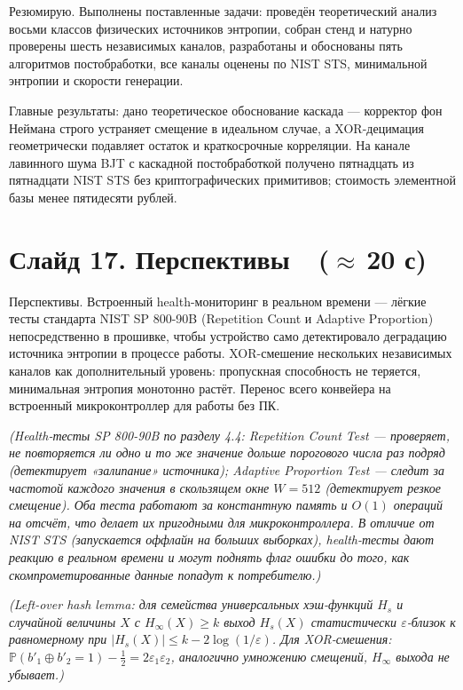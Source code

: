 \documentclass[12pt,a4paper]{extarticle}
\newcommand{\note}[1]{%
  \par
  {\small\color{noteclr}\itshape (#1)}%
  \par}
\begin{document}
Резюмирую. Выполнены поставленные задачи: проведён теоретический анализ
восьми классов физических источников энтропии, собран стенд и натурно
проверены шесть независимых каналов, разработаны и обоснованы пять
алгоритмов постобработки, все каналы оценены по NIST STS, минимальной
энтропии и скорости генерации.

Главные результаты: дано теоретическое обоснование каскада --- корректор
фон Неймана строго устраняет смещение в идеальном случае, а XOR-децимация
геометрически подавляет остаток и краткосрочные корреляции. На канале
лавинного шума BJT с каскадной постобработкой получено пятнадцать из
пятнадцати NIST STS без криптографических примитивов; стоимость элементной
базы менее пятидесяти рублей.

\section*{Слайд 17. Перспективы~~($\approx$\,20 с)}

Перспективы. Встроенный health-мониторинг в реальном времени --- лёгкие
тесты стандарта NIST SP 800-90B (Repetition Count и Adaptive Proportion)
непосредственно в прошивке, чтобы устройство само детектировало деградацию
источника энтропии в процессе работы. XOR-смешение нескольких независимых
каналов как дополнительный уровень: пропускная способность не теряется,
минимальная энтропия монотонно растёт. Перенос всего конвейера на встроенный
микроконтроллер для работы без ПК.

\note{Health-тесты SP 800-90B по разделу 4.4: \emph{Repetition Count Test} ---
проверяет, не повторяется ли одно и то же значение дольше порогового числа
раз подряд (детектирует «залипание» источника); \emph{Adaptive Proportion
Test} --- следит за частотой каждого значения в скользящем окне $W=512$
(детектирует резкое смещение). Оба теста работают за константную память и
$O(1)$ операций на отсчёт, что делает их пригодными для микроконтроллера.
В отличие от NIST STS (запускается оффлайн на больших выборках), health-тесты
дают реакцию в реальном времени и могут поднять флаг ошибки до того, как
скомпрометированные данные попадут к потребителю.}

\note{Left-over hash lemma: для семейства универсальных хэш-функций $H_s$ и
случайной величины $X$ с $H_\infty(X)\ge k$ выход $H_s(X)$ статистически
$\varepsilon$-близок к равномерному при $|H_s(X)|\le k-2\log(1/\varepsilon)$.
Для XOR-смешения: $\mathbb{P}(b'_1\oplus b'_2=1)-\tfrac12=
2\varepsilon_1\varepsilon_2$, аналогично умножению смещений, $H_\infty$
выхода не убывает.}
\end{document}
